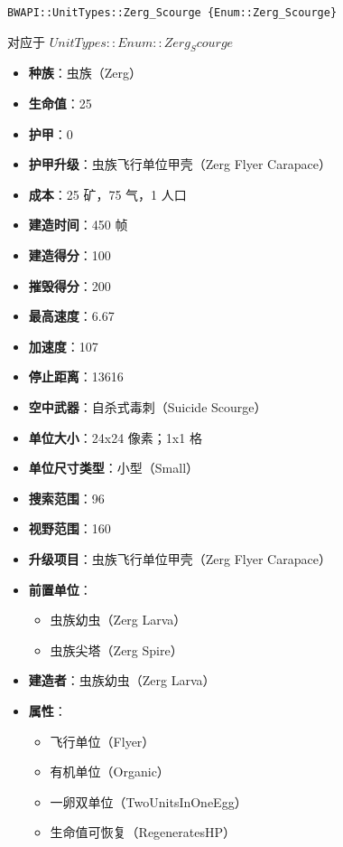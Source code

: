 \begin{tcolorbox}[colback=white, colframe=black!60!white, title=Zerg\_Scourge(), arc=0mm]
    \begin{verbatim}
BWAPI::UnitTypes::Zerg_Scourge {Enum::Zerg_Scourge}
    \end{verbatim}
    对应于  $ UnitTypes::Enum::Zerg_Scourge $ 
    \begin{itemize}
        \item \textbf{种族}：虫族（Zerg）
        \item \textbf{生命值}：25
        \item \textbf{护甲}：0
        \item \textbf{护甲升级}：虫族飞行单位甲壳（Zerg Flyer Carapace）
        \item \textbf{成本}：25 矿，75 气，1 人口
        \item \textbf{建造时间}：450 帧
        \item \textbf{建造得分}：100
        \item \textbf{摧毁得分}：200
        \item \textbf{最高速度}：6.67
        \item \textbf{加速度}：107
        \item \textbf{停止距离}：13616
        \item \textbf{空中武器}：自杀式毒刺（Suicide Scourge）
        \item \textbf{单位大小}：24x24 像素；1x1 格
        \item \textbf{单位尺寸类型}：小型（Small）
        \item \textbf{搜索范围}：96
        \item \textbf{视野范围}：160
        \item \textbf{升级项目}：虫族飞行单位甲壳（Zerg Flyer Carapace）
        \item \textbf{前置单位}：
            \begin{itemize}
                \item 虫族幼虫（Zerg Larva）
                \item 虫族尖塔（Zerg Spire）
            \end{itemize}
        \item \textbf{建造者}：虫族幼虫（Zerg Larva）
        \item \textbf{属性}：
            \begin{itemize}
                \item 飞行单位（Flyer）
                \item 有机单位（Organic）
                \item 一卵双单位（TwoUnitsInOneEgg）
                \item 生命值可恢复（RegeneratesHP）
            \end{itemize}
    \end{itemize}
\end{tcolorbox}

